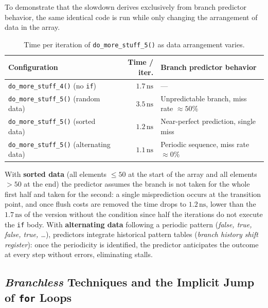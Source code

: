 To demonstrate that the slowdown derives exclusively from branch predictor behavior, the same identical code is run while only changing the arrangement of data in the array.

\begin{table}[htbp]
  \centering
  \small
  \setlength{\tabcolsep}{5pt}
  \begin{tabularx}{\textwidth}{l r Y}
    \toprule
    \textbf{Configuration} & \textbf{Time / iter.} & \textbf{Branch predictor behavior} \\
    \midrule
    \texttt{do\_more\_stuff\_4()} (no \texttt{if}) & $1.7\,\text{ns}$ & --- \\
    \texttt{do\_more\_stuff\_5()} (random data)    & $3.5\,\text{ns}$ & Unpredictable branch, miss rate $\approx 50\%$ \\
    \texttt{do\_more\_stuff\_5()} (sorted data)    & $1.2\,\text{ns}$ & Near-perfect prediction, single miss \\
    \texttt{do\_more\_stuff\_5()} (alternating data)& $1.1\,\text{ns}$ & Periodic sequence, miss rate $\approx 0\%$ \\
    \bottomrule
  \end{tabularx}
  \caption{Time per iteration of \texttt{do\_more\_stuff\_5()} as data arrangement varies.}
  \label{tab:branch-prediction-benchmark-en}
\end{table}

With \textbf{sorted data} (all elements $\le 50$ at the start of the array and all elements $> 50$ at the end) the predictor assumes the branch is not taken for the whole first half and taken for the second: a single misprediction occurs at the transition point, and once flush costs are removed the time drops to $1.2\,\text{ns}$, lower than the $1.7\,\text{ns}$ of the version without the condition since half the iterations do not execute the \texttt{if} body. With \textbf{alternating data} following a periodic pattern (\textit{false, true, false, true, \ldots}), predictors integrate historical pattern tables (\textit{branch history shift register}): once the periodicity is identified, the predictor anticipates the outcome at every step without errors, eliminating stalls.

\subsection{\textit{Branchless} Techniques and the Implicit Jump of \texttt{for} Loops}

